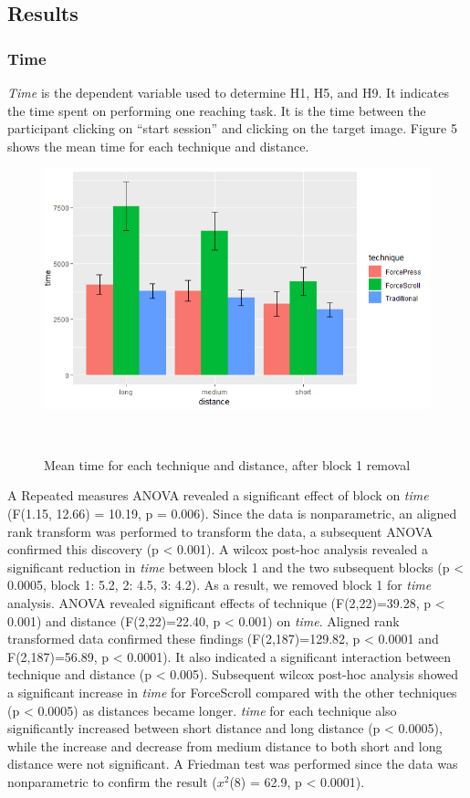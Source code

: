 \documentclass{sigchi}
\begin{document}
\subsection{Results}
\subsubsection{Time}
\textit{Time} is the dependent variable used to determine H1, H5, and H9. It indicates the time spent on performing one reaching task. It is the time between the participant clicking on ``start session'' and clicking on the target image. Figure 5 shows the mean time for each technique and distance.
\begin{figure}[!h]
	\centering
	\includegraphics[width=0.8\columnwidth]{figures/figure4}
	\caption{Mean time for each technique and distance, after block 1 removal}~\label{fig:figure5}
\end{figure}
 
A Repeated measures ANOVA revealed a significant effect of block on \textit{time} (F(1.15, 12.66) = 10.19, p = 0.006). Since the data is nonparametric, an aligned rank transform was performed to transform the data, a subsequent ANOVA confirmed this discovery (p < 0.001). A wilcox post-hoc analysis revealed a significant reduction in \textit{time} between block 1 and the two subsequent blocks (p < 0.0005, block 1: 5.2, 2: 4.5, 3: 4.2). As a result, we removed block 1 for \textit{time} analysis. ANOVA revealed significant effects of technique (F(2,22)=39.28, p < 0.001) and distance (F(2,22)=22.40, p < 0.001) on \textit{time}. Aligned rank transformed data confirmed these findings (F(2,187)=129.82, p < 0.0001 and F(2,187)=56.89, p < 0.0001). It also indicated a significant interaction between technique and distance (p < 0.005). Subsequent wilcox post-hoc analysis showed a significant increase in \textit{time} for ForceScroll compared with the other techniques (p < 0.0005) as distances became longer. \textit{time} for each technique also significantly increased between short distance and long distance (p < 0.0005), while the increase and decrease from medium distance to both short and long distance were not significant. A Friedman test was performed since the data was nonparametric to confirm the result ($x^{2}$(8) = 62.9, p < 0.0001).
\end{document}
